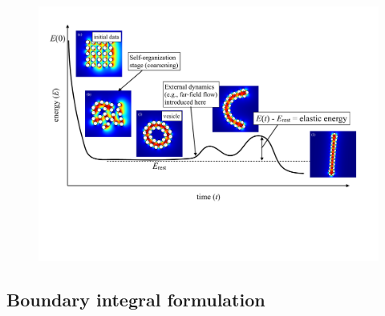\begin{figure}[t!]
\begin{center}
\includegraphics[width=\textwidth]{figures/Background/coarsening.pdf}
\end{center}
\caption{\label{fig:coarsening}}
\end{figure}
\subsection{Boundary integral formulation}
\label{sec:bie}

